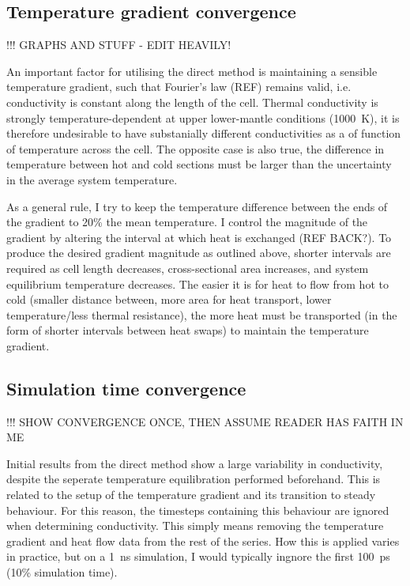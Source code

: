 \subsection{\label{sec:3.DM.grad}Temperature gradient convergence}

!!! GRAPHS AND STUFF - EDIT HEAVILY!

An important factor for utilising the direct method is maintaining a sensible temperature gradient, such that Fourier's law (REF) remains valid, i.e. conductivity is constant along the length of the cell. Thermal conductivity is strongly temperature-dependent at upper lower-mantle conditions (1000~K), it is therefore undesirable to have substanially different conductivities as a of function of temperature across the cell. The opposite case is also true, the difference in temperature between hot and cold sections must be larger than the uncertainty in the average system temperature. 

As a general rule, I try to keep the temperature difference between the ends of the gradient to 20\% the mean temperature. I control the magnitude of the gradient by altering the interval at which heat is exchanged (REF BACK?). To produce the desired gradient magnitude as outlined above, shorter intervals are required as cell length decreases, cross-sectional area increases, and system equilibrium temperature decreases. The easier it is for heat to flow from hot to cold (smaller distance between, more area for heat transport, lower temperature/less thermal resistance), the more heat must be transported (in the form of shorter intervals between heat swaps) to maintain the temperature gradient.


\subsection{\label{sec:3.DM.time}Simulation time convergence}

!!! SHOW CONVERGENCE ONCE, THEN ASSUME READER HAS FAITH IN ME

Initial results from the direct method show a large variability in conductivity, despite the seperate temperature equilibration performed beforehand. This is related to the setup of the temperature gradient and its transition to steady behaviour. For this reason, the timesteps containing this behaviour are ignored when determining conductivity. This simply means removing the temperature gradient and heat flow data from the rest of the series. How this is applied varies in practice, but on a 1~ns simulation, I would typically ingnore the first 100~ps (10\% simulation time).

